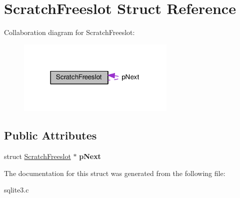 \hypertarget{structScratchFreeslot}{}\section{Scratch\+Freeslot Struct Reference}
\label{structScratchFreeslot}


Collaboration diagram for Scratch\+Freeslot\+:\nopagebreak
\begin{figure}[H]
\begin{center}
\leavevmode
\includegraphics[width=214pt]{structScratchFreeslot__coll__graph}
\end{center}
\end{figure}
\subsection*{Public Attributes}
\begin{DoxyCompactItemize}
\item 
struct \hyperlink{structScratchFreeslot}{Scratch\+Freeslot} $\ast$ {\bfseries p\+Next}\hypertarget{structScratchFreeslot_aca5c55a56a2a63a5be0756707a04bee8}{}\label{structScratchFreeslot_aca5c55a56a2a63a5be0756707a04bee8}

\end{DoxyCompactItemize}


The documentation for this struct was generated from the following file\+:\begin{DoxyCompactItemize}
\item 
sqlite3.\+c\end{DoxyCompactItemize}
